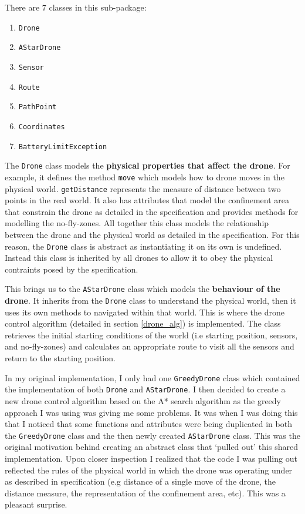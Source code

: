 \documentclass[11pt]{article}
\begin{document}
There are 7 classes in this sub-package:
\begin{enumerate}[topsep=0pt, itemsep=0pt]
    \item \texttt{Drone}
    \item \texttt{AStarDrone}
    \item \texttt{Sensor}
    \item \texttt{Route}
    \item \texttt{PathPoint}
    \item \texttt{Coordinates}
    \item \texttt{BatteryLimitException}
\end{enumerate}

The \texttt{Drone} class models the \textbf{physical properties that affect the drone}. For example, it defines the method \texttt{move} which models how to drone moves in the physical world. \texttt{getDistance} represents the measure of distance between two points in the real world. It also has attributes that model the confinement area that constrain the drone as detailed in the specification and provides methods for modelling the no-fly-zones. All together this class models the relationship between the drone and the physical world as detailed in the specification. For this reason, the \texttt{Drone} class is abstract as instantiating it on its own is undefined. Instead this class is inherited by all drones to allow it to obey the physical contraints posed by the specification.

This brings us to the \texttt{AStarDrone} class which models the \textbf{behaviour of the drone}. It inherits from the \texttt{Drone} class to understand the physical world, then it uses its own methods to navigated within that world. This is where the drone control algorithm (detailed in section \ref{drone_alg}) is implemented. The class retrieves the initial starting conditions of the world (i.e starting position, sensors, and no-fly-zones) and calculates an appropriate route to visit all the sensors and return to the starting position.

\begin{mdframed}
In my original implementation, I only had one \texttt{GreedyDrone} class which contained the implementation of both \texttt{Drone} and \texttt{AStarDrone}. I then decided to create a new drone control algorithm based on the A* search algorithm as the greedy approach I was using was giving me some problems. It was when I was doing this that I noticed that some functions and attributes were being duplicated in both the \texttt{GreedyDrone} class and the then newly created \texttt{AStarDrone} class. This was the original motivation behind creating an abstract class that `pulled out' this shared implementation. Upon closer inspection I realized that the code I was pulling out reflected the rules of the physical world in which the drone was operating under as described in specification (e.g distance of a single move of the drone, the distance measure, the representation of the confinement area, etc). This was a pleasant surprise.
\end{mdframed}
\end{document}
